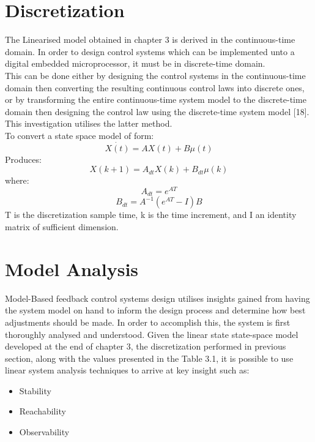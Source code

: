 \documentclass[12pt,a4paper,twoside]{report}
\begin{document}
		\section{Discretization}
			The Linearised model obtained in chapter 3 is derived in the continuous-time domain. In order to design control systems which can be implemented unto a digital embedded microprocessor, it must be in discrete-time domain.
			\\
			This can be done either by designing the control systems in the continuous-time domain then converting the resulting continuous control laws into discrete ones, or by transforming the entire continuous-time system model to the discrete-time domain then designing the control law using the discrete-time system model [18]. This investigation utilises the latter method.
			\\
			To convert a state space model of form:
			\[
				\dot{X(t)} = AX(t) + B\mu(t)
			\]
			Produces:
			\begin{equation}
				X(k+1) = A_{dt}X(k) + B_{dt}\mu(k)
			\end{equation}
			where:
			\begin{equation}
				A_{dt} = e^{AT} 
			\end{equation}
			\begin{equation}
				B_{dt} = A^{-1}(e^{AT} - I)B
			\end{equation}
			\space
			T is the discretization sample time, k is the time increment, and I an identity matrix of sufficient dimension.
			
		\section{Model Analysis}
			
			Model-Based feedback control systems design utilises insights gained from having the system model on hand to inform the design process and determine how best adjustments should be made. In order to accomplish this, the system is first thoroughly analysed and understood. Given the linear state state-space model developed at the end of chapter 3, the discretization performed in previous section, along with the values presented in the Table 3.1, it is possible to use linear system analysis techniques to arrive at key insight such as:
			
			\begin{itemize}
				\item 
					Stability
				\item 
					Reachability
				\item
					Observability
			\end{itemize}
		
\end{document}
